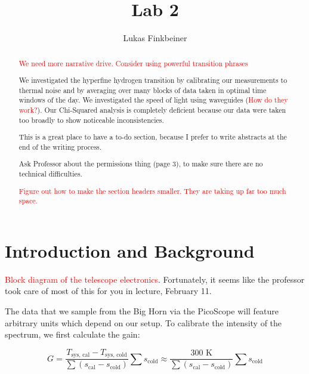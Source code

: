 \documentclass[12pt]{article}
\title{Lab 2}
\author{Lukas Finkbeiner}
\begin{document}
\maketitle

\begin{abstract}

\textcolor{red}{We need more narrative drive. Consider using powerful transition phrases}

We investigated the hyperfine hydrogen transition by calibrating our measurements to thermal noise and by averaging over many blocks of data taken in optimal time windows of the day. We investigated the speed of light using waveguides (\textcolor{red}{How do they work?}). Our Chi-Squared analysis is completely deficient because our data were taken too broadly to show noticeable inconsistencies.

This is a great place to have a to-do section, because I prefer to write abstracts at the end of the writing process.

\quad * Ask Professor about the permissions thing (page 3), to make sure there are no technical difficulties.

\textcolor{red}{Figure out how to make the section headers smaller. They are taking up far too much space.}

\end{abstract}


\section{Introduction and Background}

\textcolor{red}{Block diagram of the telescope electronics}. Fortunately, it seems like the professor took care of most of this for you in lecture, February 11.



The data that we sample from the Big Horn via the PicoScope will feature arbitrary units which depend on our setup. To calibrate the intensity of the spectrum, we first calculate the gain:

\begin{equation}
G = \frac{T_\text{sys, cal} - T_\text{sys, cold}}{\sum (s_\text{cal} - s_\text{cold})} \sum s_\text{cold} \approx \frac{\text{300 K}}{\sum (s_\text{cal} - s_\text{cold})} \sum s_\text{cold}
\end{equation}
\end{document}

